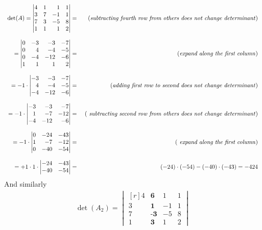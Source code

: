 \documentclass[8pt]{article} %
\begin{document}
\begin{description}
{			\[\begin{array}{rr}
			\det(A)=\begin{vmatrix*}[r]4&1&1&1\\3&7&-1&1\\7&3&-5&8\\1&1&1&2\end{vmatrix*}
			= &\mbox{ (\textit{subtracting fourth row from others does not change determinant})}\\\\
			=\begin{vmatrix*}[r]0&-3&-3&-7\\0&4&-4&-5\\0&-4&-12&-6\\1&1&1&2\end{vmatrix*}
			= &\mbox{ (\textit{expand along the first column})}\\\\
			=-1\cdot\begin{vmatrix*}[r]-3&-3&-7\\4&-4&-5\\-4&-12&-6\end{vmatrix*}
			= &\mbox{ (\textit{adding first row to second does not change determinant})}\\\\
			=-1\cdot\begin{vmatrix*}[r]-3&-3&-7\\1&-7&-12\\-4&-12&-6\end{vmatrix*}
			= &\mbox{ (\textit{ subtracting second row from others does not change determinant})}\\\\
			=-1\cdot\begin{vmatrix*}[r]0&-24&-43\\1&-7&-12\\0&-40&-54\end{vmatrix*}
			= &\mbox{ (\textit{ expand along the first column})}\\\\
			=+1\cdot1\cdot\begin{vmatrix*}[r]-24&-43\\-40&-54\end{vmatrix*}
			=&(-24)\cdot(-54)-(-40)\cdot(-43)=-424
			\end{array}\]
			And similarly
			\[\begin{array}{rr}
			\det(A_2)=\begin{vmatrix*}[r]4&\textbf{6}&1&1\\3&\textbf{1}&-1&1\\7&\textbf{-3}&-5&8\\1&\textbf{3}&1&2\end{vmatrix*}

\end{array}\]}
\end{description}
\end{document}
